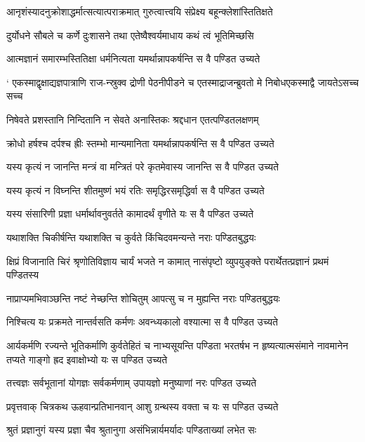 \twolineshloka
{आनृशंस्यादनुक्रोशाद्धर्मात्सत्यात्पराक्रमात्}
{गुरुत्वात्त्वयि संप्रेक्ष्य बहून्क्लेशांस्तितिक्षते}


\twolineshloka
{दुर्योधने सौबले च कर्णे दुःशासने तथा}
{एतेष्वैश्वर्यमाधाय कथं त्वं भूतिमिच्छसि}


\twolineshloka
{आत्मज्ञानं समारम्भस्तितिक्षा धर्मनित्यता}
{यमर्थान्नापकर्षन्ति स वै पण्डित उच्यते}


\twolineshloka
{` एकस्माद्वृक्षाद्यज्ञपात्राणि राज-न्स्रुक्व द्रोणी पेठनीपीडने च}
{एतस्माद्राजन्ब्रुवतो मे निबोधएकस्माद्वै जायतेऽसच्च सच्च}


\twolineshloka
{निषेवते प्रशस्तानि निन्दितानि न सेवते}
{अनास्तिकः श्रद्दधान एतत्पण्डितलक्षणम्}


\twolineshloka
{क्रोधो हर्षश्च दर्पश्च ह्रीः स्तम्भो मान्यमानिता}
{यमर्थान्नापकर्षन्ति स वै पण्डित उच्यते}


\twolineshloka
{यस्य कृत्यं न जानन्ति मन्त्रं वा मन्त्रितं परे}
{कृतमेवास्य जानन्ति स वै पण्डित उच्यते}


\twolineshloka
{यस्य कृत्यं न विघ्नन्ति शीतमुष्णं भयं रतिः}
{समृद्धिरसमृद्धिर्वा स वै पण्डित उच्यते}


\twolineshloka
{यस्य संसारिणी प्रज्ञा धर्मार्थावनुवर्तते}
{कामादर्थं वृणीते यः स वै पण्डित उच्यते}


\twolineshloka
{यथाशक्ति चिकीर्षन्ति यथाशक्ति च कुर्वते}
{किंचिदवमन्यन्ते नराः पण्डितबुद्धयः}


\twolineshloka
{क्षिप्रं विजानाति चिरं श्रृणोतिविज्ञाय चार्यं भजते न कामात्}
{नासंपृष्टो व्युपयुङ्क्ते परार्थेतत्प्रज्ञानं प्रथमं पण्डितस्य}


\twolineshloka
{नाप्राप्यमभिवाञ्छन्ति नष्टं नेच्छन्ति शोचितुम्}
{आपत्सु च न मुह्यन्ति नराः पण्डितबुद्धयः}


\twolineshloka
{निश्चित्य यः प्रक्रमते नान्तर्वसति कर्मणः}
{अवन्ध्यकालो वश्यात्मा स वै पण्डित उच्यते}


आर्यकर्मणि रज्यन्ते भूतिकर्माणि कुर्वतेहितं च नाभ्यसूयन्ति पण्डिता भरतर्षभ
\twolineshloka
{न हृष्यत्यात्मसंमाने नावमानेन तप्यते}
{गाङ्गो ह्रद इवाक्षोभ्यो यः स पण्डित उच्यते}


\twolineshloka
{तत्त्वज्ञः सर्वभूतानां योगज्ञः सर्वकर्मणाम्}
{उपायज्ञो मनुष्याणां नरः पण्डित उच्यते}


\twolineshloka
{प्रवृत्तवाक् चित्रकथ ऊहवान्प्रतिभानवान्}
{आशु ग्रन्थस्य वक्ता च यः स पण्डित उच्यते}


\twolineshloka
{श्रुतं प्रज्ञानुगं यस्य प्रज्ञा चैव श्रुतानुगा}
{असंभिन्नार्यमर्यादः पण्डिताख्यां लभेत सः}


